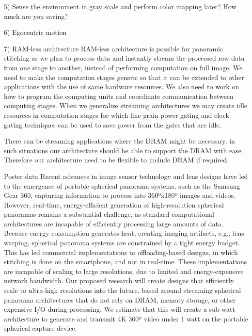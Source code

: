  5) Sense the environment in gray scale and perform color mapping later? How much are you saving? 
 
 6) Egocentric motion 

7) RAM-less architecture
RAM-less architecture is possible for panoramic stitching as we plan to process data and instantly stream the processed row data from one stage to another, instead of performing computation on full image.  We need to make the computation stages generic so that it can be extended to other applications with the use of same hardware resources. We also need to work on how to program the computing units and coordinate communication between computing stages. When we generalize streaming architectures we may create idle resources in computation stages for which fine grain power gating and clock gating techniques can be used to save power from the gates that are idle. 

There can be streaming applications where the DRAM might be necessary, in such situations our architecture should be able to support the DRAM with ease. Therefore our architecture need to be flexible to include DRAM if required.

Poster data \newline
Recent advances in image sensor technology and lens designs have led to the emergence of
portable spherical panorama systems, such as the Samsung Gear 360, capturing information to
process into 360ºx180º images and videos. However, real-time, energy-efficient generation of
high-resolution spherical panoramas remains a substantial challenge, as standard
computational architectures are incapable of efficiently processing large amounts of data.
Because energy consumption generates heat, creating imaging artifacts, e.g., lens warping,
spherical panorama systems are constrained by a tight energy budget. This has led commercial
implementations to offloading-based designs, in which stitching is done on the smartphone, and
not in real-time. These implementations are incapable of scaling to large resolutions, due to
limited and energy-expensive network bandwidth. Our proposed research will create designs
that efficiently scale to ultra-high resolutions into the future, based around streaming spherical
panorama architectures that do not rely on DRAM, memory storage, or other expensive I/O
during processing. We estimate that this will create a sub-watt architecture to generate and
transmit 4K 360º video under 1 watt on the portable spherical capture device. \newline

